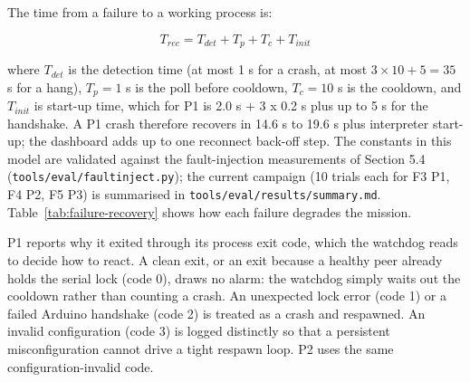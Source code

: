 The time from a failure to a working process is:

\begin{equation}
T_{rec} = T_{det} + T_{p} + T_{c} + T_{init}
\end{equation}

where $T_{det}$ is the detection time (at most 1 s for a crash, at most $3 \times 10 + 5 = 35$ s for a hang), $T_{p} = 1$ s is the poll before cooldown, $T_{c} = 10$ s is the cooldown, and $T_{init}$ is start-up time, which for P1 is 2.0 s + 3 x 0.2 s plus up to 5 s for the handshake. A P1 crash therefore recovers in 14.6 s to 19.6 s plus interpreter start-up; the dashboard adds up to one reconnect back-off step. The constants in this model are validated against the fault-injection measurements of Section 5.4 (\texttt{tools/eval/faultinject.py}); the current campaign (10 trials each for F3 P1, F4 P2, F5 P3) is summarised in \texttt{tools/eval/results/summary.md}. Table~\ref{tab:failure-recovery} shows how each failure degrades the mission.

P1 reports why it exited through its process exit code, which the watchdog reads to decide how to react. A clean exit, or an exit because a healthy peer already holds the serial lock (code 0), draws no alarm: the watchdog simply waits out the cooldown rather than counting a crash. An unexpected lock error (code 1) or a failed Arduino handshake (code 2) is treated as a crash and respawned. An invalid configuration (code 3) is logged distinctly so that a persistent misconfiguration cannot drive a tight respawn loop. P2 uses the same configuration-invalid code.

